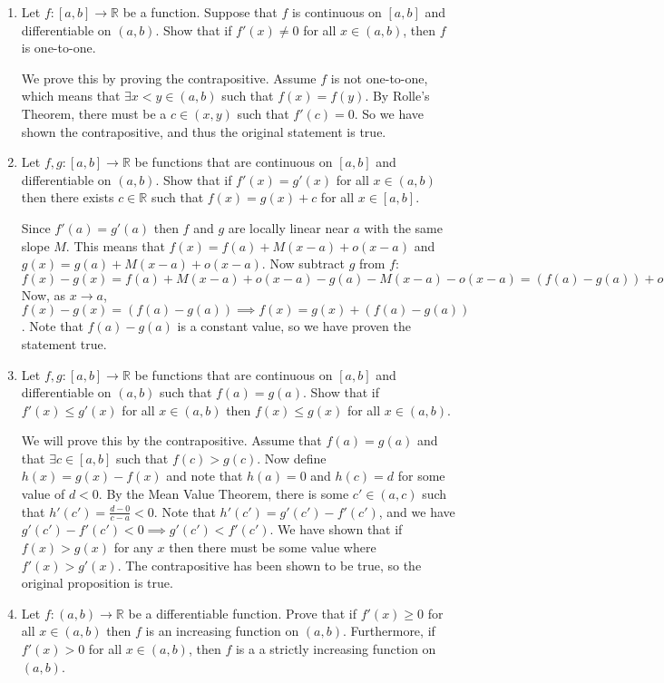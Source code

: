 \documentclass[11pt]{article}
\newcommand{\R}{\mathbb{R}}
\begin{document}
\begin{enumerate}
\item{Let $f:[a,b]\to\R$ be a function. Suppose that $f$ is continuous on
$[a,b]$ and differentiable on $(a,b)$. Show that if $f'(x)\neq0$ for all
$x\in(a,b)$, then $f$ is one-to-one.}

We prove this by proving the contrapositive. Assume $f$ is not one-to-one,
which means that $\exists x<y\in(a,b)$ such that $f(x)=f(y)$.
By Rolle's Theorem, there must be a $c\in(x,y)$ such that $f'(c)=0$.
So we have shown the contrapositive, and thus the original statement
is true.

\item{Let $f,g:[a,b]\to\R$ be functions that are continuous on $[a,b]$ and
differentiable on $(a,b)$. Show that if $f'(x)=g'(x)$ for all $x\in(a,b)$
then there exists $c\in\R$ such that $f(x)=g(x)+c$ for all $x\in[a,b]$.}

Since $f'(a)=g'(a)$ then $f$ and $g$ are locally linear near $a$ with the
same slope $M$. This means that $f(x)=f(a)+M(x-a)+o(x-a)$ and
$g(x)=g(a)+M(x-a)+o(x-a)$. Now subtract $g$ from $f$:
$f(x)-g(x)=f(a)+M(x-a)+o(x-a)-g(a)-M(x-a)-o(x-a)=
(f(a)-g(a))+o(x-a)-o(x-a)$ Now, as $x\to a$,
$f(x)-g(x)=(f(a)-g(a))\implies f(x)=g(x)+(f(a)-g(a))$. Note that
$f(a)-g(a)$ is a constant value, so we have proven the statement true.

\item{Let $f,g:[a,b]\to\R$ be functions that are continuous on $[a,b]$
and differentiable on $(a,b)$ such that $f(a)=g(a)$. Show that if
$f'(x)\leq g'(x)$ for all $x\in(a,b)$ then $f(x)\leq g(x)$ for all
$x\in(a,b)$.}

We will prove this by the contrapositive. Assume that $f(a)=g(a)$ and that
$\exists c\in[a,b]$ such that $f(c)>g(c)$. Now define $h(x)=g(x)-f(x)$
and note that $h(a)=0$ and $h(c)=d$ for some value of $d<0$. 
By the Mean Value Theorem, there is some $c'\in(a,c)$ such that
$h'(c')=\frac{d-0}{c-a}<0$. Note that $h'(c')=g'(c')-f'(c')$, and we have
$g'(c')-f'(c')<0\implies g'(c')<f'(c')$. We have shown that if
$f(x)>g(x)$ for any $x$ then there must be some value where
$f'(x)>g'(x)$. The contrapositive has been shown to be true, so the original
proposition is true.


\setcounter{enumi}{7}
\item{Let $f:(a,b)\to\R$ be a differentiable function. Prove that if
$f'(x)\geq 0$ for all $x\in(a,b)$ then $f$ is an increasing function on
$(a,b)$. Furthermore, if $f'(x)>0$ for all $x\in(a,b)$, then $f$ is a
a strictly increasing function on $(a,b)$.}


\end{enumerate}
\end{document}
